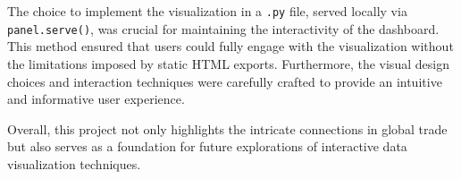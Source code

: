 \documentclass{article}
\begin{document}
The choice to implement the visualization in a \texttt{.py} file, served locally via \texttt{panel.serve()}, was crucial for maintaining the interactivity of the dashboard. This method ensured that users could fully engage with the visualization without the limitations imposed by static HTML exports. Furthermore, the visual design choices and interaction techniques were carefully crafted to provide an intuitive and informative user experience.

Overall, this project not only highlights the intricate connections in global trade but also serves as a foundation for future explorations of interactive data visualization techniques.

\newpage



\begin{refcontext}[sorting=nyt]
\printbibliography
\end{refcontext}
\end{document}
